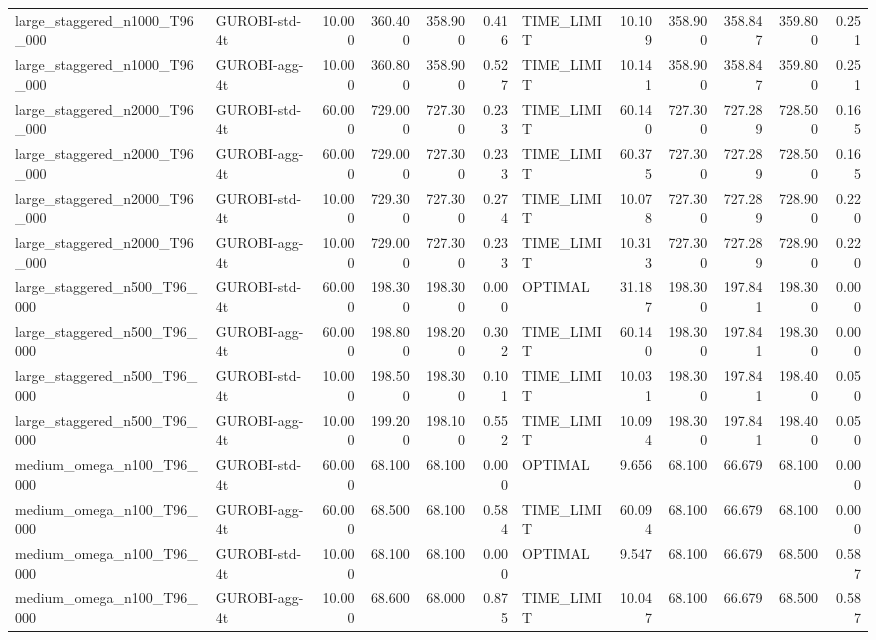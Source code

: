 \begin{table}[htbp]
\begin{tabular}{llrrrrlrrrrr}
large\_staggered\_n1000\_T96\_000 & GUROBI-std-4t & 10.000 & 360.400 & 358.900 & 0.416 & TIME\_LIMIT & 10.109 & 358.900 & 358.847 & 359.800 & 0.251 \\
large\_staggered\_n1000\_T96\_000 & GUROBI-agg-4t & 10.000 & 360.800 & 358.900 & 0.527 & TIME\_LIMIT & 10.141 & 358.900 & 358.847 & 359.800 & 0.251 \\
large\_staggered\_n2000\_T96\_000 & GUROBI-std-4t & 60.000 & 729.000 & 727.300 & 0.233 & TIME\_LIMIT & 60.140 & 727.300 & 727.289 & 728.500 & 0.165 \\
large\_staggered\_n2000\_T96\_000 & GUROBI-agg-4t & 60.000 & 729.000 & 727.300 & 0.233 & TIME\_LIMIT & 60.375 & 727.300 & 727.289 & 728.500 & 0.165 \\
large\_staggered\_n2000\_T96\_000 & GUROBI-std-4t & 10.000 & 729.300 & 727.300 & 0.274 & TIME\_LIMIT & 10.078 & 727.300 & 727.289 & 728.900 & 0.220 \\
large\_staggered\_n2000\_T96\_000 & GUROBI-agg-4t & 10.000 & 729.000 & 727.300 & 0.233 & TIME\_LIMIT & 10.313 & 727.300 & 727.289 & 728.900 & 0.220 \\
large\_staggered\_n500\_T96\_000 & GUROBI-std-4t & 60.000 & 198.300 & 198.300 & 0.000 & OPTIMAL & 31.187 & 198.300 & 197.841 & 198.300 & 0.000 \\
large\_staggered\_n500\_T96\_000 & GUROBI-agg-4t & 60.000 & 198.800 & 198.200 & 0.302 & TIME\_LIMIT & 60.140 & 198.300 & 197.841 & 198.300 & 0.000 \\
large\_staggered\_n500\_T96\_000 & GUROBI-std-4t & 10.000 & 198.500 & 198.300 & 0.101 & TIME\_LIMIT & 10.031 & 198.300 & 197.841 & 198.400 & 0.050 \\
large\_staggered\_n500\_T96\_000 & GUROBI-agg-4t & 10.000 & 199.200 & 198.100 & 0.552 & TIME\_LIMIT & 10.094 & 198.300 & 197.841 & 198.400 & 0.050 \\
medium\_omega\_n100\_T96\_000 & GUROBI-std-4t & 60.000 & 68.100 & 68.100 & 0.000 & OPTIMAL & 9.656 & 68.100 & 66.679 & 68.100 & 0.000 \\
medium\_omega\_n100\_T96\_000 & GUROBI-agg-4t & 60.000 & 68.500 & 68.100 & 0.584 & TIME\_LIMIT & 60.094 & 68.100 & 66.679 & 68.100 & 0.000 \\
medium\_omega\_n100\_T96\_000 & GUROBI-std-4t & 10.000 & 68.100 & 68.100 & 0.000 & OPTIMAL & 9.547 & 68.100 & 66.679 & 68.500 & 0.587 \\
medium\_omega\_n100\_T96\_000 & GUROBI-agg-4t & 10.000 & 68.600 & 68.000 & 0.875 & TIME\_LIMIT & 10.047 & 68.100 & 66.679 & 68.500 & 0.587 \\

\end{tabular}
\end{table}

